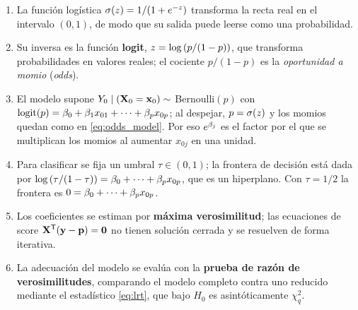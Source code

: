 \begin{enumerate}
  \item La funci\'on log\'istica $\sigma(z)=1/(1+e^{-z})$ transforma la recta real
        en el intervalo $(0,1)$, de modo que su salida puede leerse como una
        probabilidad.
  \item Su inversa es la funci\'on \textbf{logit},
        $z=\log\left( p/(1-p) \right)$, que transforma probabilidades en valores reales;
        el cociente $p/(1-p)$ es la \emph{oportunidad a momio} (\emph{odds}).
  \item El modelo supone $Y_0\mid(\mathbf{X}_0=\mathbf{x}_0)\sim$ Bernoulli$(p)$ con
        $\operatorname{logit}(p)=\beta_0+\beta_1x_{01}+\dots+\beta_px_{0p}$; al
        despejar, $p=\sigma(z)$ y los momios quedan como en
        \eqref{eq:odds_model}. Por eso $e^{\beta_j}$ es el factor por el que se
        multiplican los momios al aumentar $x_{0j}$ en una unidad.
  \item Para clasificar se fija un umbral $\tau\in(0,1)$; la frontera de
        decisi\'on est\'a dada por
        $\log\left( \tau/(1-\tau) \right)=\beta_0+\dots+\beta_px_{0p}$, que es un hiperplano.
        Con $\tau=1/2$ la frontera es $0=\beta_0+\dots+\beta_px_{0p}$.
  \item Los coeficientes se estiman por \textbf{m\'axima verosimilitud}; las
        ecuaciones de score $\mathbf{X}^{\mathsf{T}}(\mathbf{y}-\mathbf{p})=\mathbf{0}$ no tienen
        soluci\'on cerrada y se resuelven de forma iterativa.
  \item La adecuaci\'on del modelo se eval\'ua con la \textbf{prueba de raz\'on
        de verosimilitudes}, comparando el modelo completo contra uno reducido
        mediante el estad\'istico \eqref{eq:lrt}, que bajo $H_0$ es
        asint\'oticamente $\chi^2_q$.
\end{enumerate}
